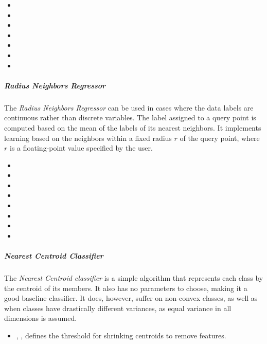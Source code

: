 \begin{itemize}
  \item {}
  \item {}
  \item {}
  \item {}
  \item {}
  \item {}
  \item {}
\end{itemize}

\subparagraph{Radius Neighbors Regressor}
\mbox{}

The \textit{Radius Neighbors Regressor} can be used in cases where the data
labels are continuous rather than discrete variables.
%
The label assigned to a query point is computed based on the mean of the labels
of its nearest neighbors.
%
It implements learning based on the neighbors within a fixed radius $r$ of the
query point, where $r$ is a floating-point value specified by the user.

\begin{itemize}
  \item {}
  \item {}
  \item {}
  \item {}
  \item {}
  \item {}
  \item {}
  \item {}
\end{itemize}
\subparagraph{Nearest Centroid Classifier}
\mbox{}

The \textit{Nearest Centroid classifier} is a simple algorithm that represents
each class by the centroid of its members.
%
It also has no parameters to choose, making it a good baseline classifier.
%
It does, however, suffer on non-convex classes, as well as when classes have
drastically different variances, as equal variance in all dimensions is assumed.

\begin{itemize}
  \item {}, , defines
  the threshold for shrinking centroids to remove features.
\end{itemize}

